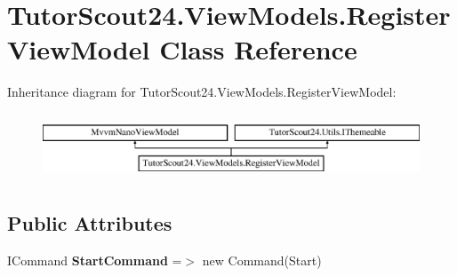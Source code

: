 \hypertarget{class_tutor_scout24_1_1_view_models_1_1_register_view_model}{}\section{Tutor\+Scout24.\+View\+Models.\+Register\+View\+Model Class Reference}
\label{class_tutor_scout24_1_1_view_models_1_1_register_view_model}
Inheritance diagram for Tutor\+Scout24.\+View\+Models.\+Register\+View\+Model\+:\begin{figure}[H]
\begin{center}
\leavevmode
\includegraphics[height=1.992882cm]{class_tutor_scout24_1_1_view_models_1_1_register_view_model}
\end{center}
\end{figure}
\subsection*{Public Attributes}
\begin{DoxyCompactItemize}
\item 
\mbox{\label{class_tutor_scout24_1_1_view_models_1_1_register_view_model_a20f4d2278ecacfda01685de5ab12777c}} 
I\+Command {\bfseries Start\+Command} =$>$ new Command(Start)
\end{DoxyCompactItemize}
